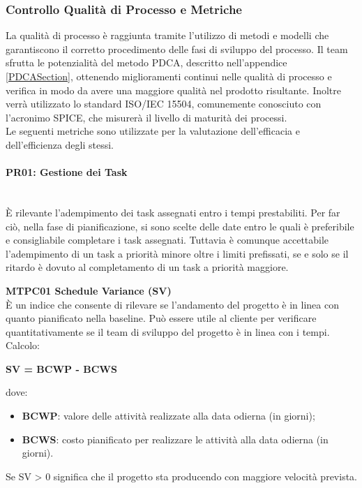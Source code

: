 \subsubsection{Controllo Qualità di Processo e Metriche} \label{ControlloQualita_Processo}
La qualità di processo è raggiunta tramite l'utilizzo di metodi e modelli che garantiscono il corretto procedimento delle fasi di sviluppo del processo. Il team sfrutta le potenzialità del metodo PDCA, descritto nell'appendice \ref{PDCASection}, ottenendo miglioramenti continui nelle qualità di processo e verifica in modo da avere una maggiore qualità nel prodotto risultante. Inoltre verrà utilizzato lo standard ISO/IEC 15504, comunemente conosciuto con l'acronimo SPICE, che misurerà il livello di maturità dei processi.\-\\
Le seguenti metriche sono utilizzate per la valutazione dell'efficacia e dell'efficienza degli stessi.

\paragraph{PR01: Gestione dei Task} \-\\
È rilevante l'adempimento dei task assegnati entro i tempi prestabiliti. Per far ciò, nella fase di pianificazione, si sono scelte delle date entro le quali è preferibile e consigliabile completare i task assegnati. Tuttavia è comunque accettabile l'adempimento di un task a priorità minore oltre i limiti prefissati, se e solo se il ritardo è dovuto al completamento di un task a priorità maggiore.

\begin{itemize}

	\item \textbf{MTPC01 Schedule Variance (SV)}\-\\
È un indice che consente di rilevare se l'andamento del progetto è in linea con quanto pianificato nella baseline\glossario. Può essere utile al cliente per verificare quantitativamente se il team di sviluppo del progetto è in linea con i tempi. \-\\
Calcolo:\-\\
\begin{center}
	\item \textbf{SV = BCWP - BCWS}
\end{center}
dove:
\begin{itemize}
	\item \textbf{BCWP}: valore delle attività realizzate alla data odierna (in giorni);
	\item \textbf{BCWS}: costo pianificato per realizzare le attività alla data odierna (in giorni).
\end{itemize}
Se SV > 0 significa che il progetto sta producendo con maggiore velocità prevista.

\end{itemize}

